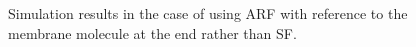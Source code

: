 \documentclass[a4paper,12pt]{book}
\begin{document}
\begin{figure}[tbp]
 \caption{Simulation results in the case of using ARF with reference to the membrane molecule at the end rather than SF.}
 \label{fig:res2}
\end{figure}

\end{document}
